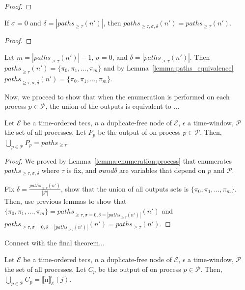 \begin{proof}

\end{proof}

\begin{lemma}\label{lemma:paths_equivalence}
If $\sigma = 0$ and $\delta = |{paths}_{\ge \tau}(n')|$, then ${paths}_{\ge \tau, \sigma, \delta}(n') = {paths}_{\ge \tau}(n')$.
\end{lemma}

\begin{proof}

\end{proof}

Let $m = |{paths}_{\ge \tau}(n')| - 1$, $\sigma=0$, and $\delta = |{paths}_{\ge \tau}(n')|$. Then ${paths}_{\ge \tau}(n') = \{\pi_{0}, \pi_{1}, \ldots, \pi_{m}\}$ and by Lemma~\ref{lemma:paths_equivalence} ${paths}_{\ge \tau, \sigma, \delta}(n') = \{\pi_{0}, \pi_{1}, \ldots, \pi_{m}\}$.

Now, we proceed to show that when the enumeration is performed on each process $p \in \mathcal{P}$, the union of the outputs is equivalent to ...

\begin{lemma}
Let $\mathcal{E}$ be a time-ordered \acrshort{tecs}, $n$ a duplicate-free node of $\mathcal{E}$, $\epsilon$ a time-window, $\mathcal{P}$ the set of all processes. Let $P_{p}$ be the output of  on process $p \in \mathcal{P}$. Then, $\bigcup\limits_{p \in \mathcal{P}} P_{p} = paths_{\ge \tau}$.
\end{lemma}

\begin{proof}
  We proved by Lemma~\ref{lemma:enumeration:process} that  enumerates $paths_{\ge \tau, \sigma, \delta}$ where $\tau$ is fix, and $\sigma and \delta$ are variables that depend on $p$ and $\mathcal{P}$.

  Fix $\delta = \frac{{paths}_{\ge \tau}(n')}{|\mathcal{P}|}$, show that the union of all outputs sets is $\{\pi_{0}, \pi_{1}, \ldots, \pi_{m}\}$. Then, use previous lemmas to show that $\{\pi_{0}, \pi_{1}, \ldots, \pi_{m}\} = {paths}_{\ge \tau, \sigma=0, \delta=|{paths}_{\ge \tau}(n')|}(n')$ and ${paths}_{\ge \tau, \sigma=0, \delta=|{paths}_{\ge \tau}(n')|}(n') = {paths}_{\ge \tau}(n')$.
\end{proof}


Connect with the final theorem...

\begin{theorem}\label{theorem:enumeration}
Let $\mathcal{E}$ be a time-ordered \acrshort{tecs}, $n$ a duplicate-free node of $\mathcal{E}$, $\epsilon$ a time-window, $\mathcal{P}$ the set of all processes. Let $C_{p}$ be the output of  on process $p \in \mathcal{P}$. Then, $\bigcup\limits_{p \in \mathcal{P}} C_{p} = {\llbracket \text{n} \rrbracket}^{\epsilon}_{\mathcal{E}}(j)$.
\end{theorem}

